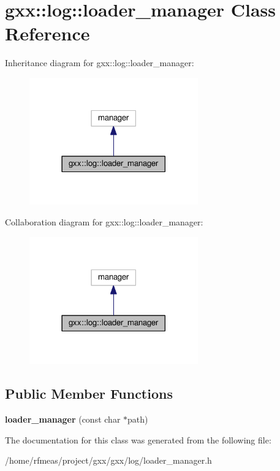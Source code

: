 \hypertarget{classgxx_1_1log_1_1loader__manager}{}\section{gxx\+:\+:log\+:\+:loader\+\_\+manager Class Reference}
\label{classgxx_1_1log_1_1loader__manager}


Inheritance diagram for gxx\+:\+:log\+:\+:loader\+\_\+manager\+:
\nopagebreak
\begin{figure}[H]
\begin{center}
\leavevmode
\includegraphics[width=206pt]{classgxx_1_1log_1_1loader__manager__inherit__graph}
\end{center}
\end{figure}


Collaboration diagram for gxx\+:\+:log\+:\+:loader\+\_\+manager\+:
\nopagebreak
\begin{figure}[H]
\begin{center}
\leavevmode
\includegraphics[width=206pt]{classgxx_1_1log_1_1loader__manager__coll__graph}
\end{center}
\end{figure}
\subsection*{Public Member Functions}
\begin{DoxyCompactItemize}
\item 
{\bfseries loader\+\_\+manager} (const char $\ast$path)\hypertarget{classgxx_1_1log_1_1loader__manager_adea5a43f2382dfb0c061ec9bbe878ff5}{}\label{classgxx_1_1log_1_1loader__manager_adea5a43f2382dfb0c061ec9bbe878ff5}

\end{DoxyCompactItemize}


The documentation for this class was generated from the following file\+:\begin{DoxyCompactItemize}
\item 
/home/rfmeas/project/gxx/gxx/log/loader\+\_\+manager.\+h\end{DoxyCompactItemize}
